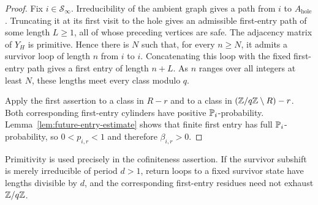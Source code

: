 \begin{proof}
Fix \(i\in\mathcal S_\infty\).  Irreducibility of the ambient graph
gives a path from \(i\) to \(A_{\mathrm{hole}}\).  Truncating it at its
first visit to the hole gives an admissible first-entry path of some
length \(L\geq1\), all of whose preceding vertices are safe.  The
adjacency matrix of \(Y_H\) is primitive.  Hence there is \(N\) such
that, for every \(n\geq N\), it admits a survivor loop of length \(n\)
from \(i\) to \(i\).  Concatenating this loop with the fixed first-entry
path gives a first entry of length \(n+L\).  As \(n\) ranges over all
integers at least \(N\), these lengths meet every class modulo \(q\).

Apply the first assertion to a class in \(R-r\) and to a class in
\((\mathbb{Z}/q\mathbb{Z}\setminus R)-r\).  Both corresponding first-entry cylinders
have positive \(\mathbb{P}_i\)-probability.  Lemma~\ref{lem:future-entry-estimate}
shows that finite first entry has full \(\mathbb{P}_i\)-probability, so
\(0<p_{i,r}<1\) and therefore \(\beta_{i,r}>0\).
\end{proof}

\begin{remark}
Primitivity is used precisely in the cofiniteness assertion.  If the
survivor subshift is merely irreducible of period \(d>1\), return loops
to a fixed survivor state have lengths divisible by \(d\), and the
corresponding first-entry residues need not exhaust \(\mathbb{Z}/q\mathbb{Z}\).
\end{remark}

